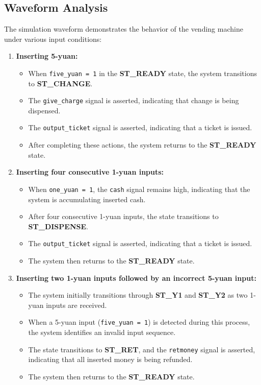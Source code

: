 \documentclass[]{article}
\begin{document}
\subsection{Waveform Analysis}
\noindent The simulation waveform demonstrates the behavior of the vending machine under various input conditions:

\begin{enumerate}
    \item \textbf{Inserting 5-yuan:}
          \begin{itemize}
              \item When \texttt{five\_yuan = 1} in the \textbf{ST\_READY} state, the system transitions to \textbf{ST\_CHANGE}.
              \item The \texttt{give\_charge} signal is asserted, indicating that change is being dispensed.
              \item The \texttt{output\_ticket} signal is asserted, indicating that a ticket is issued.
              \item After completing these actions, the system returns to the \textbf{ST\_READY} state.
          \end{itemize}

    \item \textbf{Inserting four consecutive 1-yuan inputs:}
          \begin{itemize}
              \item When \texttt{one\_yuan = 1}, the \texttt{cash} signal remains high, indicating that the system is accumulating inserted cash.
              \item After four consecutive 1-yuan inputs, the state transitions to \textbf{ST\_DISPENSE}.
              \item The \texttt{output\_ticket} signal is asserted, indicating that a ticket is issued.
              \item The system then returns to the \textbf{ST\_READY} state.
          \end{itemize}

    \item \textbf{Inserting two 1-yuan inputs followed by an incorrect 5-yuan input:}
          \begin{itemize}
              \item The system initially transitions through \textbf{ST\_Y1} and \textbf{ST\_Y2} as two 1-yuan inputs are received.
              \item When a 5-yuan input (\texttt{five\_yuan = 1}) is detected during this process, the system identifies an invalid input sequence.
              \item The state transitions to \textbf{ST\_RET}, and the \texttt{retmoney} signal is asserted, indicating that all inserted money is being refunded.
              \item The system then returns to the \textbf{ST\_READY} state.
          \end{itemize}
\end{enumerate}
\end{document}
